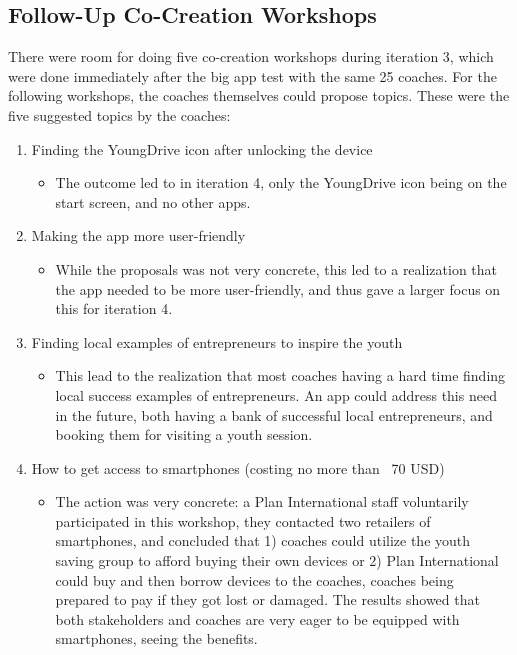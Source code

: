 \subsection{Follow-Up Co-Creation Workshops}

  There were room for doing five co-creation workshops during iteration 3, which were done immediately after the big app test with the same 25 coaches. For the following workshops, the coaches themselves could propose topics. These were the five suggested topics by the coaches:

  \begin{enumerate}
  \item Finding the YoungDrive icon after unlocking the device
  \begin{itemize}
    \item The outcome led to in iteration 4, only the YoungDrive icon being on the start screen, and no other apps.
  \end{itemize}
  \item Making the app more user-friendly
  \begin{itemize}
    \item While the proposals was not very concrete, this led to a realization that the app needed to be more user-friendly, and thus gave a larger focus on this for iteration 4.
  \end{itemize}
  \item Finding local examples of entrepreneurs to inspire the youth
  \begin{itemize}
    \item This lead to the realization that most coaches having a hard time finding local success examples of entrepreneurs. An app could address this need in the future, both having a bank of successful local entrepreneurs, and booking them for visiting a youth session.
  \end{itemize}
  \item How to get access to smartphones (costing no more than ~70 USD)
  \begin{itemize}
    \item The action was very concrete: a Plan International staff voluntarily participated in this workshop, they contacted two retailers of smartphones, and concluded that 1) coaches could utilize the youth saving group to afford buying their own devices or 2) Plan International could buy and then borrow devices to the coaches, coaches being prepared to pay if they got lost or damaged. The results showed that both stakeholders and coaches are very eager to be equipped with smartphones, seeing the benefits.

\end{itemize}
\end{enumerate}
